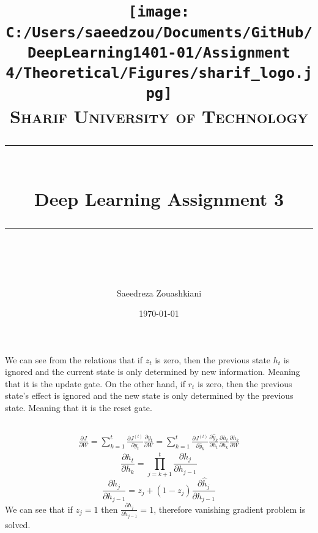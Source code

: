 \documentclass[11pt]{scrartcl} %
\title{	
	\texttt{[image: C:/Users/saeedzou/Documents/GitHub/DeepLearning1401-01/Assignment 4/Theoretical/Figures/sharif\_logo.jpg]}\\
	\normalfont\normalsize
	\textsc{Sharif University of Technology}\\ %
	\vspace{25pt} %
	\rule{\linewidth}{0.5pt}\\ %
	\vspace{20pt} %
	{\huge Deep Learning Assignment 3}\\ %
	\vspace{12pt} %
	\rule{\linewidth}{2pt}\\ %
	\vspace{12pt} %
}
\author{\LARGE Saeedreza Zouashkiani} %
\date{\normalsize\today} %
\begin{document}
\maketitle %

\section{} %
\subsection{} %
We can see from the relations that if $z_t$ is zero, then the 
previous state $h_t$ is ignored and the current state is only
determined by new information. Meaning that it is the update gate.
On the other hand, if $r_t$ is zero, then the previous state's effect
is ignored and the new state is only determined by the previous state. 
Meaning that it is the reset gate.
\subsection{} %
\begin{equation}
\begin{aligned}
	\frac{\partial J}{\partial W} =
	\sum_{k=1}^{t} \frac{\partial J^{(t)}}{\partial y_t} \frac{\partial y_t}{\partial W} =
	\sum_{k=1}^{t} \frac{\partial J^{(t)}}{\partial \hat{y}_k} \frac{\partial \hat{y}_k}{\partial h_t} \frac{\partial h_t}{\partial h_k} \frac{\partial h_k}{\partial W} 
\end{aligned}
\end{equation}
\begin{equation}
	\frac{\partial h_t}{\partial h_k} = \prod_{j=k+1}^{t} \frac{\partial h_j}{\partial h_{j-1}} 
\end{equation}
\begin{equation}
	\frac{\partial h_j}{\partial h_{j-1}}  = z_j + (1 - z_j) \frac{\partial \hat{h}_j}{\partial h_{j-1}} 
\end{equation}
We can see that if $z_j = 1$ then $\frac{\partial h_j}{\partial h_{j-1}} = 1 $, therefore vanishing gradient problem is solved. 
\end{document}
